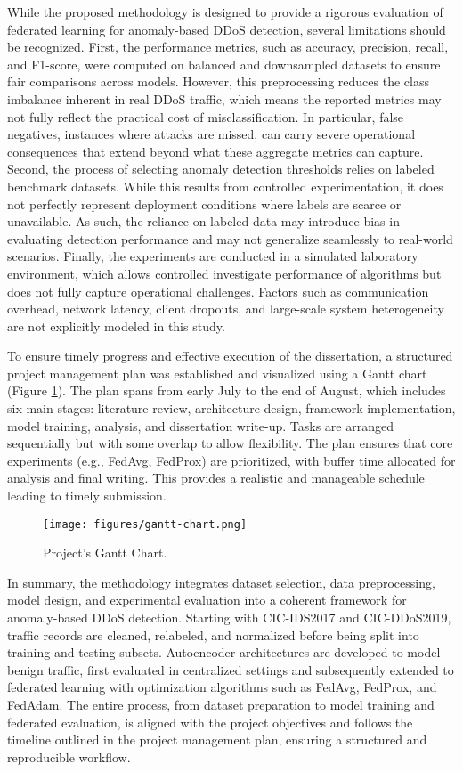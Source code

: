 While the proposed methodology is designed to provide a rigorous evaluation of federated learning for anomaly-based DDoS detection, several limitations should be recognized. First, the performance metrics, such as accuracy, precision, recall, and F1-score, were computed on balanced and downsampled datasets to ensure fair comparisons across models. However, this preprocessing reduces the class imbalance inherent in real DDoS traffic, which means the reported metrics may not fully reflect the practical cost of misclassification. In particular, false negatives, instances where attacks are missed, can carry severe operational consequences that extend beyond what these aggregate metrics can capture. Second, the process of selecting anomaly detection thresholds relies on labeled benchmark datasets. While this results from controlled experimentation, it does not perfectly represent deployment conditions where labels are scarce or unavailable. As such, the reliance on labeled data may introduce bias in evaluating detection performance and may not generalize seamlessly to real-world scenarios. Finally, the experiments are conducted in a simulated laboratory environment, which allows controlled investigate performance of algorithms but does not fully capture operational challenges. Factors such as communication overhead, network latency, client dropouts, and large-scale system heterogeneity are not explicitly modeled in this study.

To ensure timely progress and effective execution of the dissertation, a structured project management plan was established and visualized using a Gantt chart (Figure \ref{fig:gantt_chart}). The plan spans from early July to the end of August, which includes six main stages: literature review, architecture design, framework implementation, model training, analysis, and dissertation write-up. Tasks are arranged sequentially but with some overlap to allow flexibility. The plan ensures that core experiments (e.g., FedAvg, FedProx) are prioritized, with buffer time allocated for analysis and final writing. This provides a realistic and manageable schedule leading to timely submission.

\begin{figure}[h]
    \centering
    \texttt{[image: figures/gantt-chart.png]}
    \caption{Project's Gantt Chart.}
    \label{fig:gantt_chart}
\end{figure}

In summary, the methodology integrates dataset selection, data preprocessing, model design, and experimental evaluation into a coherent framework for anomaly-based DDoS detection. Starting with CIC-IDS2017 and CIC-DDoS2019, traffic records are cleaned, relabeled, and normalized before being split into training and testing subsets. Autoencoder architectures are developed to model benign traffic, first evaluated in centralized settings and subsequently extended to federated learning with optimization algorithms such as FedAvg, FedProx, and FedAdam. The entire process, from dataset preparation to model training and federated evaluation, is aligned with the project objectives and follows the timeline outlined in the project management plan, ensuring a structured and reproducible workflow.
